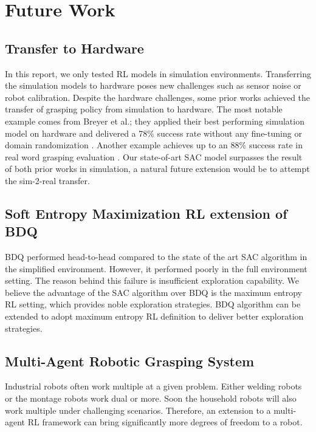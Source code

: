 \section{Future Work}

\subsection{Transfer to Hardware}
 
In this report, we only tested RL models in simulation environments. Transferring the simulation models to hardware poses new challenges such as sensor noise or robot calibration. Despite the hardware challenges, some prior works achieved the transfer of grasping policy from simulation to hardware. The most notable example comes from Breyer et al.; they applied their best performing simulation model on hardware and delivered a 78\% success rate without any fine-tuning or domain randomization \cite{Breyer2018}. Another example achieves up to an 88\% success rate in real word grasping evaluation \cite{Kalashnikov2018}. Our state-of-art SAC model surpasses the result of both prior works in simulation, a natural future extension would be to attempt the sim-2-real transfer.
 
\subsection{Soft Entropy Maximization RL extension of BDQ}
 
BDQ performed head-to-head compared to the state of the art SAC algorithm in the simplified environment. However, it performed poorly in the full environment setting. The reason behind this failure is insufficient exploration capability. We believe the advantage of the SAC algorithm over BDQ is the maximum entropy RL setting, which provides noble exploration strategies. BDQ algorithm can be extended to adopt maximum entropy RL definition to deliver better exploration strategies.
 
\subsection{Multi-Agent Robotic Grasping System}
 
Industrial robots often work multiple at a given problem. Either welding robots or the montage robots work dual or more. Soon the household robots will also work multiple under challenging scenarios. Therefore, an extension to a multi-agent RL framework can bring significantly more degrees of freedom to a robot. 
 
